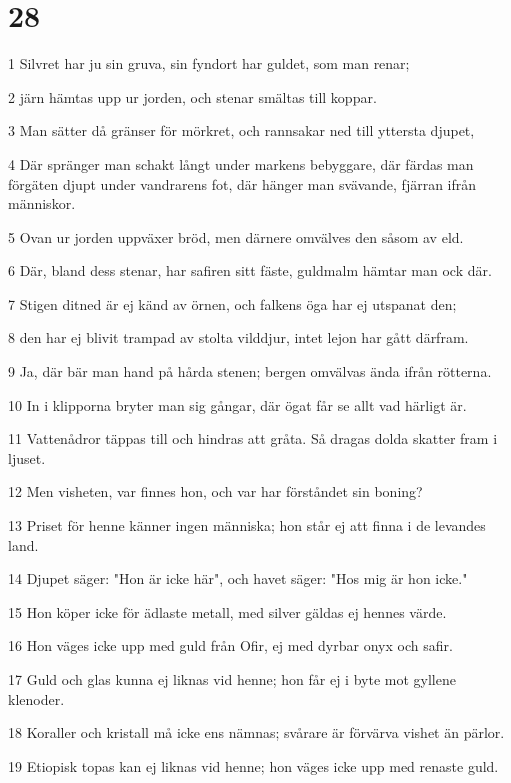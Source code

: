\chapter{28}

\par 1 Silvret har ju sin gruva, sin fyndort har guldet, som man renar;
\par 2 järn hämtas upp ur jorden, och stenar smältas till koppar.
\par 3 Man sätter då gränser för mörkret, och rannsakar ned till yttersta djupet,
\par 4 Där spränger man schakt långt under markens bebyggare, där färdas man förgäten djupt under vandrarens fot, där hänger man svävande, fjärran ifrån människor.
\par 5 Ovan ur jorden uppväxer bröd, men därnere omvälves den såsom av eld.
\par 6 Där, bland dess stenar, har safiren sitt fäste, guldmalm hämtar man ock där.
\par 7 Stigen ditned är ej känd av örnen, och falkens öga har ej utspanat den;
\par 8 den har ej blivit trampad av stolta vilddjur, intet lejon har gått därfram.
\par 9 Ja, där bär man hand på hårda stenen; bergen omvälvas ända ifrån rötterna.
\par 10 In i klipporna bryter man sig gångar, där ögat får se allt vad härligt är.
\par 11 Vattenådror täppas till och hindras att gråta. Så dragas dolda skatter fram i ljuset.
\par 12 Men visheten, var finnes hon, och var har förståndet sin boning?
\par 13 Priset för henne känner ingen människa; hon står ej att finna i de levandes land.
\par 14 Djupet säger: "Hon är icke här", och havet säger: "Hos mig är hon icke."
\par 15 Hon köper icke för ädlaste metall, med silver gäldas ej hennes värde.
\par 16 Hon väges icke upp med guld från Ofir, ej med dyrbar onyx och safir.
\par 17 Guld och glas kunna ej liknas vid henne; hon får ej i byte mot gyllene klenoder.
\par 18 Koraller och kristall må icke ens nämnas; svårare är förvärva vishet än pärlor.
\par 19 Etiopisk topas kan ej liknas vid henne; hon väges icke upp med renaste guld.

